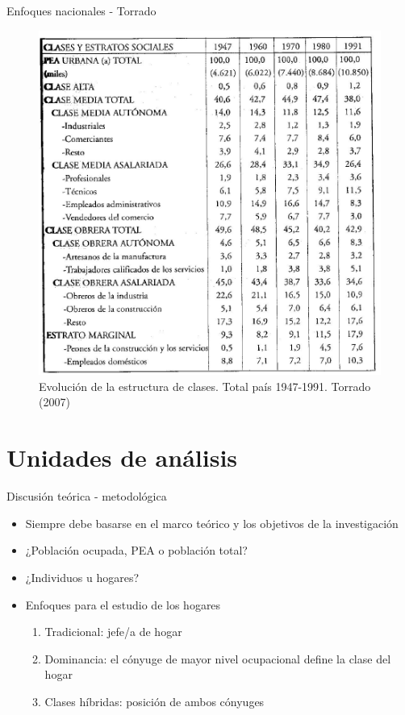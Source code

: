 \documentclass[
  spanish,
  ignorenonframetext,
]{beamer}
\providecommand{\tightlist}{%
  \setlength{\itemsep}{0pt}\setlength{\parskip}{0pt}}
\begin{document}
\begin{frame}{Enfoques nacionales - Torrado}
\protect\hypertarget{enfoques-nacionales---torrado}{}
\begin{figure}

{\centering \includegraphics[width=0.55\linewidth]{imagenes/torrado4} 

}

\caption{Evolución de la estructura de clases. Total país 1947-1991. Torrado (2007)}\label{fig:unnamed-chunk-6}
\end{figure}
\end{frame}

\hypertarget{unidades-de-anuxe1lisis}{%
\section{Unidades de análisis}\label{unidades-de-anuxe1lisis}}

\begin{frame}{Discusión teórica - metodológica}
\protect\hypertarget{discusiuxf3n-teuxf3rica---metodoluxf3gica}{}
\begin{itemize}
\tightlist
\item
  Siempre debe basarse en el marco teórico y los objetivos de la
  investigación\\
\item
  ¿Población ocupada, PEA o población total?\\
\item
  ¿Individuos u hogares?\\
\item
  Enfoques para el estudio de los hogares

  \begin{enumerate}
  \tightlist
  \item
    Tradicional: jefe/a de hogar\\
  \item
    Dominancia: el cónyuge de mayor nivel ocupacional define la clase
    del hogar\\
  \item
    Clases híbridas: posición de ambos cónyuges
  \end{enumerate}
\end{itemize}
\end{frame}
\end{document}
